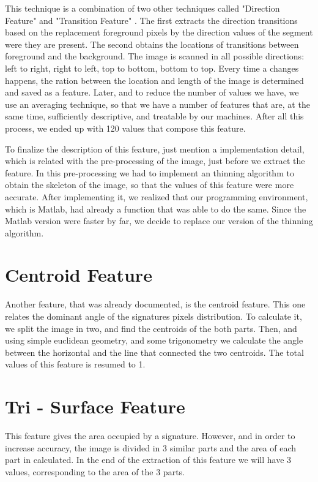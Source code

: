 \documentclass[12pt,a4paper]{report}
\begin{document}
		This technique is a combination of two other techniques called "Direction Feature" and "Transition Feature" \cite{blumenstein03}. The first extracts the direction transitions based on the replacement foreground pixels by the direction values of the segment were they are present. The second obtains the locations of transitions between foreground and the background. The image is scanned in all possible directions: left to right, right to left, top to bottom, bottom to top. Every time a changes happens, the ration between the location and length of the image is determined and saved as a feature\cite{gader97}.
		Later, and to reduce the number of values we have, we use an averaging technique, so that we have a number of features that are, at the same time, sufficiently descriptive, and treatable by our machines. After all this process, we ended up with 120 values that compose this feature. 
		
		To finalize the description of this feature, just mention a implementation detail, which is related with the pre-processing of the image, just before we extract the feature. In this pre-processing we had to implement an thinning algorithm to obtain the skeleton of the image, so that the values of this feature were more accurate. After implementing it, we realized that our programming environment, which is Matlab, had already a function that was able to do the same. Since the Matlab version were faster by far, we decide to replace our version of the thinning algorithm.
		
		
		\section{Centroid Feature}
		Another feature, that was already documented, is the centroid feature. This one relates the dominant angle of the signatures pixels distribution. To calculate it, we split the image in two, and find the centroids of the both parts. Then, and using simple euclidean geometry, and some trigonometry we calculate the angle between the horizontal and the line that connected the two centroids. The total values of this feature is resumed to 1.
		
		
		\section{Tri - Surface Feature}
		\label{sec:trisurface}
		
		This feature gives the area occupied by a signature. However, and in order to increase accuracy, the image is divided in 3 similar parts and the area of each part in calculated. In the end of the extraction of this feature we will have 3 values, corresponding to the area of the 3 parts.
		
\end{document}
